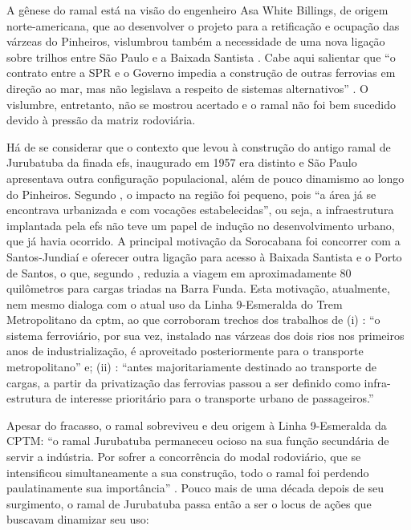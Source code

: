 \documentclass[
article,			%
11pt,				%
oneside,			%
a4paper,			%
english,			%
brazil,				%
sumario=tradicional
]{abntex2}
\begin{document}
	A gênese do ramal está na visão do engenheiro Asa White Billings, de origem norte-americana, que ao desenvolver o projeto para a retificação e ocupação das várzeas do Pinheiros, vislumbrou também a necessidade de uma nova ligação sobre trilhos entre São Paulo e a Baixada Santista \cite[p. 61]{franco2005a}. Cabe aqui salientar que ``o contrato entre a SPR e o Governo impedia a construção de outras ferrovias em direção ao mar, mas não legislava a respeito de sistemas alternativos'' \cite[p. 61]{franco2005a}. O vislumbre, entretanto, não se mostrou acertado e o ramal não foi bem sucedido devido à pressão da matriz rodoviária.
	
	Há de se considerar que o contexto que levou à construção do antigo ramal de Jurubatuba da finada \glsdesc{efs}, inaugurado em 1957 \cite[p.140]{requena2016a} era distinto e São Paulo apresentava outra configuração populacional, além de pouco dinamismo ao longo do Pinheiros. Segundo , o impacto na região foi pequeno, pois ``a área já se encontrava urbanizada e com vocações estabelecidas'', ou seja, a infraestrutura implantada pela \gls{efs} não teve um papel de indução no desenvolvimento urbano, que já havia ocorrido. A principal motivação da Sorocabana foi concorrer com a Santos-Jundiaí e oferecer outra ligação para acesso à Baixada Santista e o Porto de Santos, o que, segundo , reduzia a viagem em aproximadamente 80 quilômetros para cargas triadas na Barra Funda. Esta motivação, atualmente, nem mesmo dialoga com o atual uso da Linha 9-Esmeralda do Trem Metropolitano da \gls{cptm}, ao que corroboram trechos dos trabalhos de (i) : ``o sistema ferroviário, por sua vez, instalado nas várzeas dos dois rios nos primeiros anos de industrialização, é aproveitado posteriormente para o transporte metropolitano'' e; (ii) : ``antes majoritariamente destinado ao transporte de cargas, a partir da privatização das ferrovias passou a ser definido como infra-estrutura de interesse prioritário para o transporte urbano de passageiros.'' 
	
	Apesar do fracasso, o ramal sobreviveu e deu origem à Linha 9-Esmeralda da CPTM: ``o ramal Jurubatuba permaneceu ocioso na sua função secundária de servir a indústria. Por sofrer a concorrência do modal rodoviário, que se intensificou simultaneamente a sua construção, todo o ramal foi perdendo paulatinamente sua importância'' \cite[p.141]{requena2016a}. Pouco mais de uma década depois de seu surgimento, o ramal de Jurubatuba passa então a ser o locus de ações que buscavam dinamizar seu uso:
	
\end{document}
